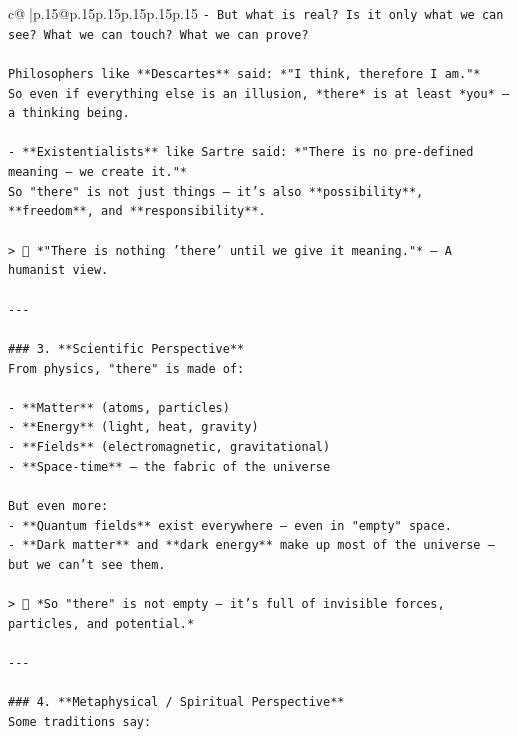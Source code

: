 \documentclass{article}
\begin{document}
{\begin{supertabular}{c@{$\;$}|p{.15\linewidth}@{}p{.15\linewidth}p{.15\linewidth}p{.15\linewidth}p{.15\linewidth}p{.15\linewidth}}
{{{\texttt{{-} But what is real? Is it only what we can see? What we can touch? What we can prove?} \\
\\ 
\texttt{Philosophers like **Descartes** said: *"I think, therefore I am."*  } \\
\texttt{So even if everything else is an illusion, *there* is at least *you* — a thinking being.} \\
\\ 
\texttt{{-} **Existentialists** like Sartre said: *"There is no pre{-}defined meaning — we create it."*  } \\
\texttt{So "there" is not just things — it’s also **possibility**, **freedom**, and **responsibility**.} \\
\\ 
\texttt{> 🧠 *"There is nothing 'there' until we give it meaning."* — A humanist view.} \\
\\ 
\texttt{{-}{-}{-}} \\
\\ 
\texttt{\#\#\# 3. **Scientific Perspective**  } \\
\texttt{From physics, "there" is made of:} \\
\\ 
\texttt{{-} **Matter** (atoms, particles)} \\
\texttt{{-} **Energy** (light, heat, gravity)} \\
\texttt{{-} **Fields** (electromagnetic, gravitational)} \\
\texttt{{-} **Space{-}time** — the fabric of the universe} \\
\\ 
\texttt{But even more:  } \\
\texttt{{-} **Quantum fields** exist everywhere — even in "empty" space.} \\
\texttt{{-} **Dark matter** and **dark energy** make up most of the universe — but we can’t see them.} \\
\\ 
\texttt{> 🌌 *So "there" is not empty — it’s full of invisible forces, particles, and potential.*} \\
\\ 
\texttt{{-}{-}{-}} \\
\\ 
\texttt{\#\#\# 4. **Metaphysical / Spiritual Perspective**  } \\
\texttt{Some traditions say:} \\
}}}
\end{supertabular}}
\end{document}
